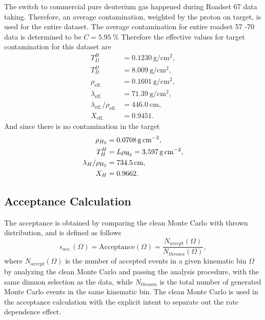 \documentclass[../main.tex]{subfiles}
\begin{document}
The switch to commercial pure deuterium gas happened during Roadset 67 data taking. Therefore,
an average contamination, weighted by the proton on target, is used for the entire dataset.
The average contamination for entire roadset 57 -70 data is determined to be $C=\SI{5.95}{\percent}$
Therefore the effective values for target contamination for this dataset are
\begin{equation}
	\begin{split}
		T_D^H &= \SI{0.1230}{\g\per\cm\squared}, \\
		T_D^D &= \SI{8.009}{\g\per\cm\squared},\\
		\rho_{\mathrm{eff.}} & = \SI{0.1601}{\g\per\cm\squared},\\
		\lambda_{\mathrm{eff.}} &= \SI{71.39}{\g\per\cm\squared},\\
		\lambda_{\mathrm{eff.}}/\rho_{\mathrm{eff.}} &= \SI{446.0}{\cm},\\
		X_{\mathrm{eff.}} &= 0.9451.
	\end{split}
\end{equation}
And since there is no contamination in the  target
\begin{equation}
	\begin{split}
		\rho_{H_2} &= \SI{0.0708}{\g\per\cm\cubed},\\
		T_H^H &= L\rho_{\ce{H_2}} = \SI{3.597}{\g\per\cm\squared},\\
		\lambda_H/\rho_{\ce{H_2}} &= \SI{734.5}{\cm},\\
		X_H &=0.9662.
	\end{split}
\end{equation}


\subsection{Acceptance Calculation}
The acceptance is obtained by comparing the clean Monte Carlo with thrown distribution,
and is defined as follows
\begin{equation}
	\epsilon_{acc.}\left(\Omega\right)=\mathrm{Acceptance}\left(\Omega\right)= \frac{N_{accept}\left(\Omega\right)}{N_{thrown}\left(\Omega\right)},
\end{equation}
where $N_{accept}\left(\Omega\right)$ is the number of accepted events in a given kinematic bin $\Omega$
by analyzing the clean Monte Carlo and passing the analysis procedure, with the same dimuon selection
as the data, while $N_{thrown}$ is the total number of generated Monte Carlo events in the same kinematic bin. 
The clean Monte Carlo is used in the acceptance calculation with the explicit intent to separate out the
rate dependence effect.
\end{document}
